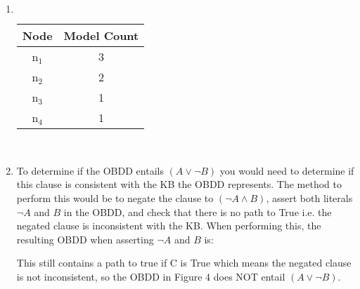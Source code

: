 \documentclass{article}
\begin{document}
\section{}
\begin{enumerate}
    \item \[\]
    \begin{center}
           \begin{tabular}{ |c|c| }
                \hline
                 Node&Model Count \\ 
                 \hline
                n$_1$&3 \\
                n$_2$&2 \\
                n$_3$&1 \\
                n$_4$&1 \\
                 \hline
                \end{tabular} \\
    \end{center}
    \item To determine if the OBDD entails $(A \lor \lnot B)$ you would need to determine if this clause is consistent with the KB the OBDD represents.  The method to perform this would be to negate the clause to $(\lnot A \land B)$, assert both literals $\lnot A$ and $B$ in the OBDD, and check that there is no path to True i.e. the negated clause is inconsistent with the KB.  When performing this, the resulting OBDD when asserting $\lnot A$ and $B$ is:
    \begin{center}
    \end{center}
    This still contains a path to true if C is True which means the negated clause is not inconsistent, so the OBDD in Figure 4 does NOT entail $(A \lor \lnot B)$.
\end{enumerate}

\clearpage
\end{document}
